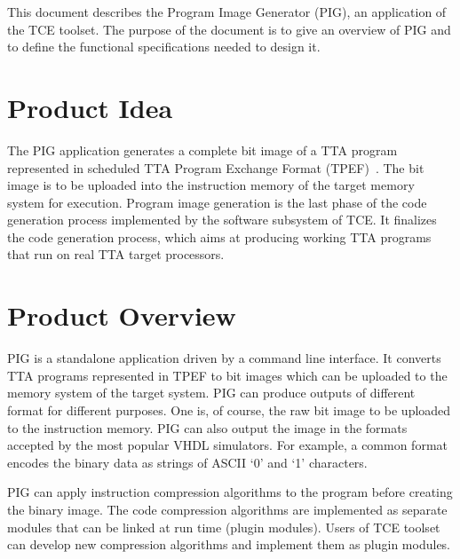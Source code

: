 \documentclass[a4paper,twoside]{tce}
\begin{document}
This document describes the Program Image Generator (PIG), an application of
the TCE toolset. The purpose of the document is to give an overview of PIG
and to define the functional specifications needed to design it.

\section{Product Idea}



The PIG application generates a complete bit image of a TTA program
represented in scheduled TTA Program Exchange Format
(TPEF)~\cite{TPEF-specs}.  The bit image is to be uploaded into the
instruction memory of the target memory system for execution. Program image
generation is the last phase of the code generation process implemented by
the software subsystem of TCE. It finalizes the code generation process,
which aims at producing working TTA programs that run on real TTA target
processors.

\section{Product Overview}




PIG is a standalone application driven by a command line interface. It
converts TTA programs represented in TPEF to bit images which can be
uploaded to the memory system of the target system. PIG can produce outputs
of different format for different purposes. One is, of course, the raw bit
image to be uploaded to the instruction memory. PIG can also output the
image in the formats accepted by the most popular VHDL simulators.  For
example, a common format encodes the binary data as strings of ASCII `0' and
`1' characters.


PIG can apply instruction compression algorithms to the program before
creating the binary image. The code compression algorithms are implemented
as separate modules that can be linked at run time (plugin modules).  Users
of TCE toolset can develop new compression algorithms and implement them as
plugin modules.
\end{document}
